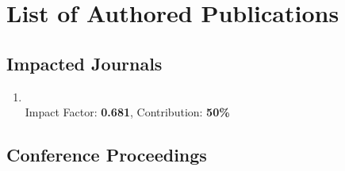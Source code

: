 \chapter{List of Authored Publications}

\section{Impacted Journals}
  
\begin{enumerate}
  \item {} \\
  \textbullet\enspace Impact Factor: \textbf{0.681}, Contribution: \textbf{50\%}
\end{enumerate}

\section{Conference Proceedings}

